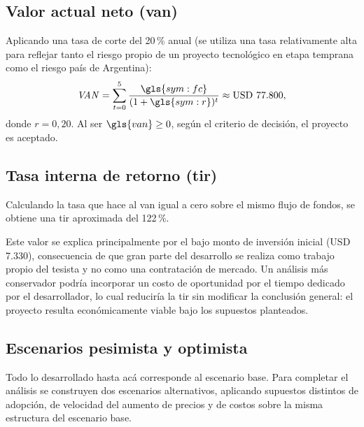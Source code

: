 \subsection{Valor actual neto (\acrshort{van})}

Aplicando una tasa de corte del 20\,\% anual (se utiliza una tasa
relativamente alta para reflejar tanto el riesgo propio de un proyecto
tecnológico en etapa temprana como el riesgo país de Argentina):
\begin{equation}
    \mathit{VAN} = \sum_{t=0}^{5} \frac{\gls{sym:fc}}{(1+\gls{sym:r})^{t}}
    \approx \text{USD } 77.800,
    \label{eq:van}
\end{equation}
donde $r = 0{,}20$. Al ser $\gls{van} \geq 0$, según el criterio de
decisión, el proyecto es aceptado.

\subsection{Tasa interna de retorno (\acrshort{tir})}

Calculando la tasa que hace al \gls{van} igual a cero sobre el mismo
flujo de fondos, se obtiene una \gls{tir} aproximada del 122\,\%.

Este valor se explica principalmente por el bajo monto de inversión
inicial (USD 7.330), consecuencia de que gran parte del desarrollo se
realiza como trabajo propio del tesista y no como una contratación de
mercado. Un análisis más conservador podría incorporar un costo de
oportunidad por el tiempo dedicado por el desarrollador, lo cual
reduciría la \gls{tir} sin modificar la conclusión general: el proyecto
resulta económicamente viable bajo los supuestos planteados.

\subsection{Escenarios pesimista y optimista}

Todo lo desarrollado hasta acá corresponde al escenario base. Para
completar el análisis se construyen dos escenarios alternativos,
aplicando supuestos distintos de adopción, de velocidad del aumento de
precios y de costos sobre la misma estructura del escenario base.

